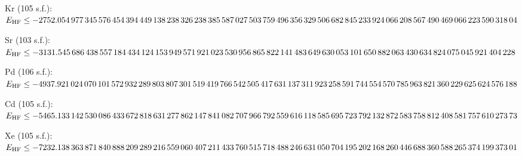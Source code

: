 \noindent Kr (105 s.f.): $E_\mathrm{HF}\le-2752.054\,\allowbreak 977\,\allowbreak 345\,\allowbreak 576\,\allowbreak 454\,\allowbreak 394\,\allowbreak 449\,\allowbreak 138\,\allowbreak 238\,\allowbreak 326\,\allowbreak 238\,\allowbreak 385\,\allowbreak 587\,\allowbreak 027\,\allowbreak 503\,\allowbreak 759\,\allowbreak 496\,\allowbreak 356\,\allowbreak 329\,\allowbreak 506\,\allowbreak 682\,\allowbreak 845\,\allowbreak 233\,\allowbreak 924\,\allowbreak 066\,\allowbreak 208\,\allowbreak 567\,\allowbreak 490\,\allowbreak 469\,\allowbreak 066\,\allowbreak 223\,\allowbreak 590\,\allowbreak 318\,\allowbreak 04$\par\medskip
\noindent Sr (103 s.f.): $E_\mathrm{HF}\le-3131.545\,\allowbreak 686\,\allowbreak 438\,\allowbreak 557\,\allowbreak 184\,\allowbreak 434\,\allowbreak 124\,\allowbreak 153\,\allowbreak 949\,\allowbreak 571\,\allowbreak 921\,\allowbreak 023\,\allowbreak 530\,\allowbreak 956\,\allowbreak 865\,\allowbreak 822\,\allowbreak 141\,\allowbreak 483\,\allowbreak 649\,\allowbreak 630\,\allowbreak 053\,\allowbreak 101\,\allowbreak 650\,\allowbreak 882\,\allowbreak 063\,\allowbreak 430\,\allowbreak 634\,\allowbreak 824\,\allowbreak 075\,\allowbreak 045\,\allowbreak 921\,\allowbreak 404\,\allowbreak 228$\par\medskip
\noindent Pd (106 s.f.): $E_\mathrm{HF}\le-4937.921\,\allowbreak 024\,\allowbreak 070\,\allowbreak 101\,\allowbreak 572\,\allowbreak 932\,\allowbreak 289\,\allowbreak 803\,\allowbreak 807\,\allowbreak 301\,\allowbreak 519\,\allowbreak 419\,\allowbreak 766\,\allowbreak 542\,\allowbreak 505\,\allowbreak 417\,\allowbreak 631\,\allowbreak 137\,\allowbreak 311\,\allowbreak 923\,\allowbreak 258\,\allowbreak 591\,\allowbreak 744\,\allowbreak 554\,\allowbreak 570\,\allowbreak 785\,\allowbreak 963\,\allowbreak 821\,\allowbreak 360\,\allowbreak 229\,\allowbreak 625\,\allowbreak 624\,\allowbreak 576\,\allowbreak 188$\par\medskip
\noindent Cd (105 s.f.): $E_\mathrm{HF}\le-5465.133\,\allowbreak 142\,\allowbreak 530\,\allowbreak 086\,\allowbreak 433\,\allowbreak 672\,\allowbreak 818\,\allowbreak 631\,\allowbreak 277\,\allowbreak 862\,\allowbreak 147\,\allowbreak 841\,\allowbreak 082\,\allowbreak 707\,\allowbreak 966\,\allowbreak 792\,\allowbreak 559\,\allowbreak 616\,\allowbreak 118\,\allowbreak 585\,\allowbreak 695\,\allowbreak 723\,\allowbreak 792\,\allowbreak 132\,\allowbreak 872\,\allowbreak 583\,\allowbreak 758\,\allowbreak 812\,\allowbreak 408\,\allowbreak 581\,\allowbreak 757\,\allowbreak 610\,\allowbreak 273\,\allowbreak 73$\par\medskip
\noindent Xe (105 s.f.): $E_\mathrm{HF}\le-7232.138\,\allowbreak 363\,\allowbreak 871\,\allowbreak 840\,\allowbreak 888\,\allowbreak 209\,\allowbreak 289\,\allowbreak 216\,\allowbreak 559\,\allowbreak 060\,\allowbreak 407\,\allowbreak 211\,\allowbreak 433\,\allowbreak 760\,\allowbreak 515\,\allowbreak 718\,\allowbreak 488\,\allowbreak 246\,\allowbreak 631\,\allowbreak 050\,\allowbreak 704\,\allowbreak 195\,\allowbreak 202\,\allowbreak 168\,\allowbreak 260\,\allowbreak 446\,\allowbreak 688\,\allowbreak 360\,\allowbreak 588\,\allowbreak 265\,\allowbreak 374\,\allowbreak 199\,\allowbreak 373\,\allowbreak 01$\par\medskip
